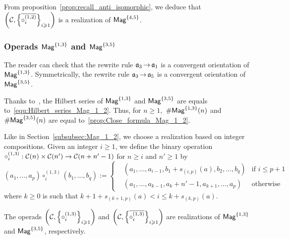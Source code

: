 From proposition~\ref{prop:recall_anti_isomorphic}, we deduce that
$\left(\mathcal{C},
 \left\{\overline{\circ_i^{(1,2)}}\right\}_{i \geqslant 1}\right)$
is a realization of $\mathsf{Mag}^{\{4, 5\}}$.
\medbreak

\subsubsection{Operads $\mathsf{Mag}^{\{1, 3\}}$ and $\mathsf{Mag}^{\{3, 5\}}$}
The reader can check that the rewrite rule $\mathfrak{a}_3 \operatorname{\to} \mathfrak{a}_1$ is a
convergent orientation of $\mathsf{Mag}^{\{1, 3\}}$. Symmetrically, the rewrite
rule $\mathfrak{a}_3 \operatorname{\to} \mathfrak{a}_5$ is a convergent orientation of
$\mathsf{Mag}^{\{3, 5\}}$.
\medbreak

Thanks to~\cite{Gir18}, the Hilbert series of $\mathsf{Mag}^{\{1, 3\}}$ and
$\mathsf{Mag}^{\{3, 5\}}$ are equals to~\eqref{equ:Hilbert_series_Mag_1_2}. Thus,
for $n \geq 1,$ $\# \mathsf{Mag}^{\{1, 3\}}(n)$ and $\# \mathsf{Mag}^{\{3, 5\}}(n)$ are
equal to~\eqref{prop:Close_formula_Mag_1_2}.
\medbreak

Like in Section~\ref{subsubsec:Mag_1_2}, we choose a realization based on
integer compositions. Given an integer $i \geq 1$, we define the
binary operation
$\circ_i^{(1,3)} : \mathcal{C}(n) \times \mathcal{C}(n')\rightarrow
\mathcal{C}(n + n' -1)$ for
$n \geq i$ and $n' \geq 1$ by
\begin{equation}
\left(a_1 , \dots, a_p\right) \circ_i^{(1,3)}
\left(b_1, \dots ,b_{q}\right) := \left\{
 \begin{split}
 & \left(a_1, \dots ,a_{i-1}, b_1 + s_{(i,p)}(a),b_2,\dots,b_{q}\right)
 & \text{if } i \leq p + 1\\
 & \left(a_1, \dots, a_{k-1}, a_{k} + n'-1, a_{k+1},\dots,a_{p}\right)
  & \text{otherwise}
 \end{split}
\right.
\end{equation} 
where $k \geq 0$ is such that
$k+1 + s_{(k+1,p)}(a) < i \leq k + s_{(k,p)}(a)$.
\medbreak

\begin{Proposition} \label{prop:Realisation_Mag_1_3}
The operads
$\left(\mathcal{C}, \left\{\circ_i^{(1,3)}\right\}_{i \geqslant 1}\right)$
and
$\left(\mathcal{C}, \left\{\overline{\circ_i^{(1,3)}}\right\}_{i \geqslant 1}
\right)$ are realizations of $\mathsf{Mag}^{\{1, 3\}}$ and $\mathsf{Mag}^{\{3, 5\}}$, respectively.
\end{Proposition}

